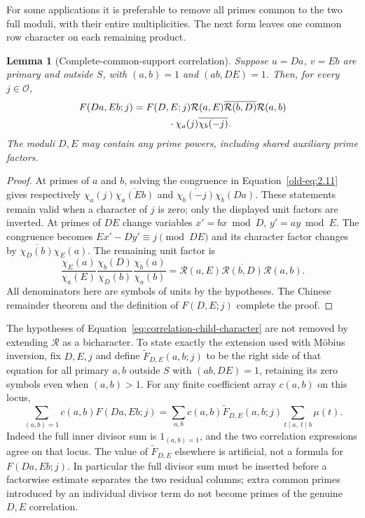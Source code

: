 \documentclass[12pt]{article}
\newtheorem{lemma}[theorem]{Lemma}
\begin{document}
For some applications it is preferable to remove all primes common to the
two full moduli, with their entire multiplicities.  The next form leaves one
common row character on each remaining product.

\begin{lemma}[Complete-common-support correlation]
\label{lem:complete-support-correlation}
Suppose $u=Da$, $v=Eb$ are primary and outside $S$, with
$(a,b)=1$ and $(ab,DE)=1$.  Then, for every $j\in\mathcal O$,
\begin{equation}
 \begin{split}
 F(Da,Eb;j)={}&F(D,E;j)\mathcal R(a,E)
       \overline{\mathcal R(b,D)}\mathcal R(a,b)\\
 &\hspace{8mm}\cdot\chi_a(j)\overline{\chi_b(-j)}.
 \end{split}
 \label{eq:correlation-child-character}
\end{equation}
The moduli $D,E$ may contain any prime powers, including shared auxiliary
prime factors.
\end{lemma}

\begin{proof}
At primes of $a$ and $b$, solving the congruence in
Equation~\eqref{old-eq:2.11} gives respectively
$\chi_a(j)\overline{\chi_a(Eb)}$ and
$\overline{\chi_b(-j)}\chi_b(Da)$.  These statements remain valid when a
character of $j$ is zero; only the displayed unit factors are inverted.
At primes of $DE$ change variables $x'=bx\bmod D$, $y'=ay\bmod E$.
The congruence becomes $Ex'-Dy'\equiv j\pmod{DE}$ and its character factor
changes by $\overline{\chi_D(b)}\chi_E(a)$.  The remaining unit factor is
\[
 \frac{\chi_E(a)}{\chi_a(E)}
 \frac{\chi_b(D)}{\chi_D(b)}
 \frac{\chi_b(a)}{\chi_a(b)}
 =\mathcal R(a,E)\overline{\mathcal R(b,D)}\mathcal R(a,b).
\]
All denominators here are symbols of units by the hypotheses.  The Chinese
remainder theorem and the definition of $F(D,E;j)$ complete the proof.
\end{proof}

The hypotheses of Equation~\eqref{eq:correlation-child-character} are not
removed by extending $\mathcal R$ as a bicharacter.  To state exactly the
extension used with M\"obius inversion, fix $D,E,j$ and define
$\widetilde F_{D,E}(a,b;j)$ to be the right side of that equation for all
primary $a,b$ outside $S$ with $(ab,DE)=1$, retaining its zero symbols even
when $(a,b)>1$.  For any finite coefficient array $c(a,b)$ on this locus,
\[
 \sum_{(a,b)=1}c(a,b)F(Da,Eb;j)
 =\sum_{a,b}c(a,b)\widetilde F_{D,E}(a,b;j)
                \sum_{t\mid a,\ t\mid b}\mu(t).
\]
Indeed the full inner divisor sum is $1_{(a,b)=1}$, and the two correlation
expressions agree on that locus.  The value of $\widetilde F_{D,E}$ elsewhere
is artificial, not a formula for $F(Da,Eb;j)$.  In particular the full
divisor sum must be inserted before a factorwise estimate separates the two
residual columns; extra common primes introduced by an individual divisor
term do not become primes of the genuine $D,E$ correlation.
\end{document}
